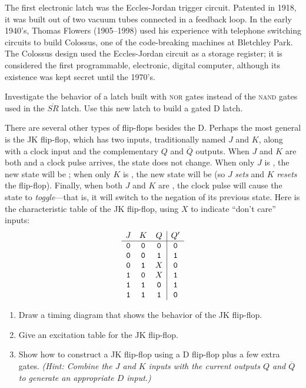 \begin{tailquote}
The first electronic latch was the Eccles-Jordan trigger circuit. Patented in 1918, it was built out of two vacuum tubes connected in a feedback loop. In the early 1940's, Thomas Flowers (1905--1998) used his experience with telephone switching circuits to build Colossus, one of the code-breaking machines at Bletchley Park. The Colossus design used the Eccles-Jordan circuit as a storage register; it is considered the first programmable, electronic, digital computer, although its existence was kept secret until the 1970's.
\end{tailquote}
\begin{exercises}
\problem Investigate the behavior of a latch built with \textsc{nor} gates instead of the \textsc{nand} gates used in the $\overline{SR}$ latch. Use this new latch to build a gated D latch.

\problem There are several other types of flip-flops besides the D. Perhaps the most general is the JK flip-flop, which has two inputs, traditionally named $J$ and $K$, along with a clock input and the complementary $Q$ and $\overline{Q}$ outputs. When $J$ and $K$ are both \0 and a clock pulse arrives, the state does not change. When only $J$ is \1, the new state will be \1; when only $K$ is \1, the new state will be \0 (so $J$ \emph{sets} and $K$ \emph{resets} the flip-flop). Finally, when both $J$ and $K$ are \1, the clock pulse will cause the state to \emph{toggle}---that is, it will switch to the negation of its previous state. Here is the characteristic table of the JK flip-flop, using $X$ to indicate ``don't care'' inputs:
\[ \begin{array}{ccc|c}
J & K & Q & Q'\\ \hline
\mathtt{0} & \mathtt{0} & \mathtt{0} & \mathtt{0}\\
\mathtt{0} & \mathtt{0} & \mathtt{1} & \mathtt{1}\\
\mathtt{0} & \mathtt{1} & X & \mathtt{0}\\
\mathtt{1} & \mathtt{0} & X & \mathtt{1}\\
\mathtt{1} & \mathtt{1} & \mathtt{0} & \mathtt{1}\\
\mathtt{1} & \mathtt{1} & \mathtt{1} & \mathtt{0}
\end{array} \]
\begin{enumerate}
\item Draw a timing diagram that shows the behavior of the JK flip-flop.
\item Give an excitation table for the JK flip-flop.
\item Show how to construct a JK flip-flop using a D flip-flop plus a few extra gates. \textit{(Hint: Combine the $J$ and $K$ inputs with the current outputs $Q$ and $\overline{Q}$ to generate an appropriate $D$ input.)}
\end{enumerate}


\end{exercises}
